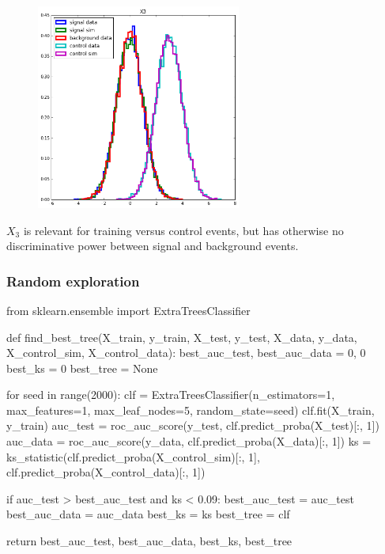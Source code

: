 \documentclass{beamer}
\begin{document}
\begin{frame}

\begin{figure}
\centering
\includegraphics[width=0.6\textwidth]{x3.png}
\end{figure}

$X_3$ is relevant for training versus control events,
but has otherwise no discriminative power between signal and
background events.

\end{frame}

\begin{frame}[fragile]
  \frametitle{Random exploration}

{\scriptsize
\begin{pythoncode}
from sklearn.ensemble import ExtraTreesClassifier

def find_best_tree(X_train, y_train, X_test, y_test,
                   X_data, y_data, X_control_sim, X_control_data):
    best_auc_test, best_auc_data = 0, 0
    best_ks = 0
    best_tree = None

    for seed in range(2000):
        clf = ExtraTreesClassifier(n_estimators=1, max_features=1,
                                   max_leaf_nodes=5, random_state=seed)
        clf.fit(X_train, y_train)
        auc_test = roc_auc_score(y_test, clf.predict_proba(X_test)[:, 1])
        auc_data = roc_auc_score(y_data, clf.predict_proba(X_data)[:, 1])
        ks = ks_statistic(clf.predict_proba(X_control_sim)[:, 1],
                          clf.predict_proba(X_control_data)[:, 1])

        if auc_test > best_auc_test and ks < 0.09:
            best_auc_test = auc_test
            best_auc_data = auc_data
            best_ks = ks
            best_tree = clf

    return best_auc_test, best_auc_data, best_ks, best_tree
\end{pythoncode}
}

\end{frame}
\end{document}
